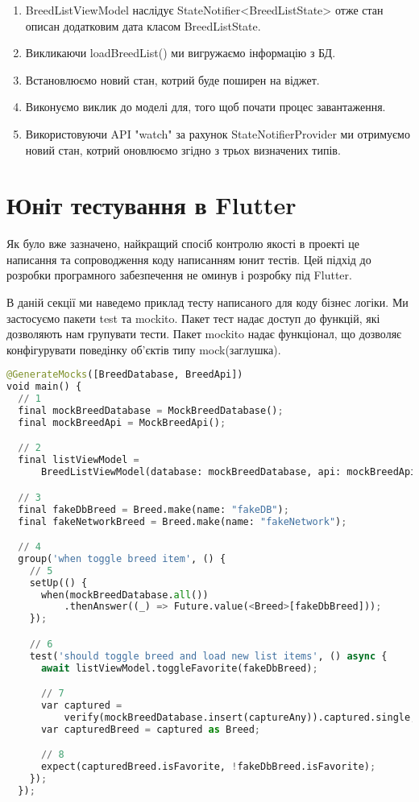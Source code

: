\begin{enumerate}
    \item BreedListViewModel наслідує StateNotifier<BreedListState> отже стан описан додатковим дата класом BreedListState.
    \item Викликаючи loadBreedList() ми вигружаємо інформацію з БД.
    \item Встановлюємо новий стан, котрий буде поширен на віджет.
    \item Виконуємо виклик до моделі для, того щоб почати процес завантаження.
    \item Використовуючи API "watch" за рахунок StateNotifierProvider ми отримуємо новий стан, котрий оновлюємо згідно з трьох визначених типів.
\end{enumerate}


\section{Юніт тестування в Flutter}
\label{section.2.6}
Як було вже зазначено, найкращий спосіб контролю якості в проекті це написання та сопроводження коду написанням юнит тестів.
Цей підхід до розробки програмного забезпечення не оминув і розробку під Flutter.

В даній секції ми наведемо приклад тесту написаного для коду бізнес логіки.
Ми застосуємо пакети test та mockito.
Пакет тест надає доступ до функцій, які дозволяють нам групувати тести.
Пакет mockito надає функціонал, що дозволяє конфігурувати поведінку об'єктів типу mock(заглушка).
\begin{lstlisting}[style=light, language=Python,label={lst:flutter_unit_test},caption=Flutter Unit Test]
@GenerateMocks([BreedDatabase, BreedApi])
void main() {
  // 1
  final mockBreedDatabase = MockBreedDatabase();
  final mockBreedApi = MockBreedApi();

  // 2
  final listViewModel =
      BreedListViewModel(database: mockBreedDatabase, api: mockBreedApi);

  // 3
  final fakeDbBreed = Breed.make(name: "fakeDB");
  final fakeNetworkBreed = Breed.make(name: "fakeNetwork");

  // 4
  group('when toggle breed item', () {
    // 5
    setUp(() {
      when(mockBreedDatabase.all())
          .thenAnswer((_) => Future.value(<Breed>[fakeDbBreed]));
    });

    // 6
    test('should toggle breed and load new list items', () async {
      await listViewModel.toggleFavorite(fakeDbBreed);

      // 7
      var captured =
          verify(mockBreedDatabase.insert(captureAny)).captured.single;
      var capturedBreed = captured as Breed;

      // 8
      expect(capturedBreed.isFavorite, !fakeDbBreed.isFavorite);
    });
  });
\end{lstlisting}

